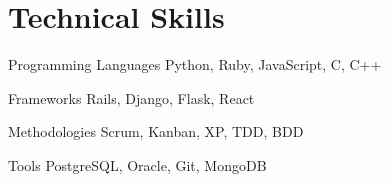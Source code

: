 \documentclass{tccv}
\begin{document}
\section{Technical Skills}

\begin{factlist}

\item{Programming Languages}
     {Python, Ruby, JavaScript, C, C++}
     
\item{Frameworks}
     {Rails, Django, Flask, React}
     
\item{Methodologies}
     {Scrum, Kanban, XP, TDD, BDD}

\item{Tools}
     {PostgreSQL, Oracle, Git, MongoDB}

\end{factlist}
\end{document}
